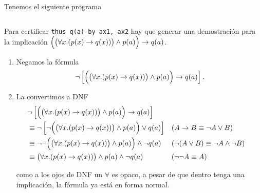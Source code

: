 \begin{ejemplo}
    Tenemos el siguiente programa

    \begin{figure}[H]
        \centering
        \begin{tabular}{c}
            
        \end{tabular}
    \end{figure}

    Para certificar \lstinline{thus q(a) by ax1, ax2} hay que generar una
    demostración para la implicación \(
        \Big(\big(\forall x. (p(x) \to q(x))\big) \wedge p(a) \Big)
        \to q(a)
    \).

    \begin{enumerate}
        \item Negamos la fórmula 
        \[
            \neg \left[
            \Big(\big(\forall x. (p(x) \to q(x))\big) \wedge p(a) \Big)
            \to q(a)
        \right].
        \]

        \item La convertimos a DNF
        \begin{align*}
            &\neg \left[
                \Big(\big(\forall x. (p(x) \to q(x))\big) \wedge p(a) \Big)
                \to q(a)
            \right] \\
            &\equiv \neg \left[
                \neg \Big(\big(\forall x. (p(x) \to q(x))\big) \wedge p(a) \Big)
                \vee q(a)
            \right] 
                && (A \to B \equiv \neg A \vee B)\\
            &\equiv
                \neg \neg \Big(\big(\forall x. (p(x) \to q(x))\big) \wedge p(a) \Big)
                \wedge \neg q(a)
                && (\neg(A \vee B) \equiv \neg A \wedge \neg B)\\
            &\equiv \big(\forall x. (p(x) \to q(x))\big) \wedge p(a)
            \wedge \neg q(a)
                && (\neg\neg A \equiv A)
        \end{align*}

        como a los ojos de DNF un $\forall$ es opaco, a pesar de que dentro
        tenga una implicación, la fórmula ya está en forma normal.


\end{enumerate}
\end{ejemplo}
